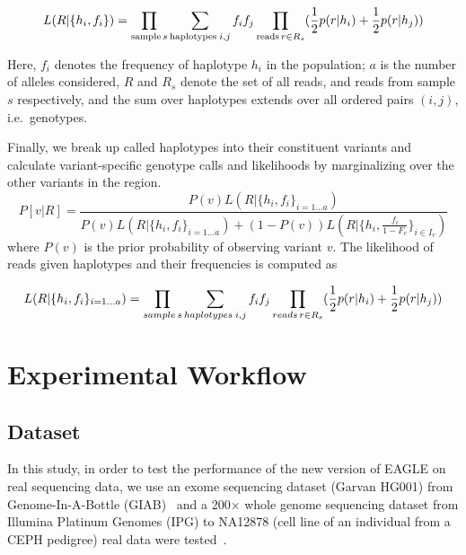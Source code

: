 \documentclass[PhD]{PHlab-thesis}
\begin{document}
\begin{equation}
  L(R|\{ {h_i,f_i} \}) = \prod_{\text{sample} \hspace{0.5mm} s}\sum_{\text{haplotypes} \hspace{0.75mm} i,j} {f_if_j} \prod_{\text{reads} \hspace{0.5mm} r \in R_s} (\frac{1}{2}p(r|h_i) + \frac{1}{2} p(r|h_j))
\end{equation}

Here, $f_i$ denotes the frequency of \hspace{0.05mm} haplotype $h_i$ in the population; $a$ is the number of alleles considered, $R$ and $R_s$ denote the set of all reads, and reads from sample $s$ respectively, and the sum over haplotypes extends over all ordered pairs $(i,j)$, i.e.\ genotypes.

Finally, we break up called haplotypes into their constituent variants and calculate variant-specific genotype calls and likelihoods by marginalizing over the other variants in the region.
\begin{equation}
  P[v|R] = \frac{P(v)L(R| \{ {h_i,f_i} \} _{i=1...a})}        {P(v)L(R| \{ {h_i,f_i} \}_{i=1...a})+(1-P(v))L(R|\{ {h_i,\frac{f_i}{1-F_v} \} _{i\in I_v}})}
\end{equation}
where $P(v)$ is the prior probability of observing variant $v$. The likelihood of reads given haplotypes and their frequencies is computed as

\begin{equation}
  L(R|\{ {h_i,f_i} \}_{i=1...a}) = \prod_{sample \hspace{0.5mm} s}\sum_{haplotypes \hspace{0.75mm} i,j} {f_if_j} \prod_{reads \hspace{0.5mm} r \in R_s} (\frac{1}{2}p(r|h_i) + \frac{1}{2} p(r|h_j))
\end{equation}

\chapter{Experimental Workflow}
\section{Dataset}
In this study, in order to test the performance of the new version of EAGLE on real sequencing data, we use an exome sequencing dataset (Garvan HG001) from Genome-In-A-Bottle (GIAB)~\cite{Zook2014GIAB} and a 200× whole genome sequencing dataset from Illumina Platinum Genomes (IPG) to NA12878 (cell line of an individual from a CEPH pedigree) real data were tested~\cite{Eberle2021IPG}.
\end{document}
